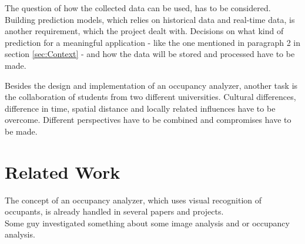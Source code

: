 The question of how the collected data can be used, has to be considered. Building prediction models, which relies on historical data and real-time data, is another requirement, which the project dealt with. Decisions on what kind of prediction for a meaningful application - like the one mentioned in paragraph 2 in section \ref{sec:Context} - and how the data will be stored and processed have to be made.

Besides the design and implementation of an occupancy analyzer, another task is the collaboration of students from two different universities. Cultural differences, difference in time, spatial distance and locally related influences have to be overcome. Different perspectives have to be combined and compromises have to be made.


\section{Related Work}


The concept of an occupancy analyzer, which uses visual recognition of occupants, is already handled in several papers and projects. \\
Some guy investigated something about some image analysis and or occupancy analysis. \\

